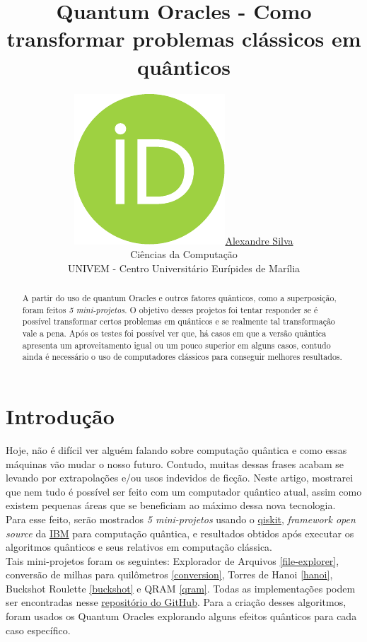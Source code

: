 \documentclass{article}
\title{Quantum Oracles - Como transformar problemas clássicos em quânticos}
\date{}
\author{ \href{https://orcid.org/0009-0008-9134-5974}{\includegraphics[scale=0.06]{orcid.pdf}\hspace{1mm}Alexandre Silva}\\
	Ciências da Computação\\
	UNIVEM - Centro Universitário Eurípides de Marília\\
}
\begin{document}
\maketitle
\begin{abstract}
	A partir do uso de quantum Oracles e outros fatores quânticos, como a superposição, foram feitos \emph{5 mini-projetos}. O objetivo desses projetos foi tentar responder se é possível transformar certos problemas em quânticos e se realmente tal transformação vale a pena. Após os testes foi possível ver que, há casos em que a versão quântica apresenta um aproveitamento igual ou um pouco superior em alguns casos, contudo ainda é necessário o uso de computadores clássicos para conseguir melhores resultados.
\end{abstract}


\section{Introdução}
Hoje, não é difícil ver alguém falando sobre computação quântica e como essas máquinas vão mudar o nosso futuro. Contudo, muitas dessas frases acabam se levando por extrapolações e/ou usos indevidos de ficção. Neste artigo, mostrarei que nem tudo é possível ser feito com um computador quântico atual, assim como existem pequenas áreas que se beneficiam ao máximo dessa nova tecnologia.\\
Para esse feito, serão mostrados \emph{5 mini-projetos} usando o \href{https://www.ibm.com/quantum/qiskit}{qiskit}, \emph{framework open source} da \href{https://www.ibm.com/}{IBM} para computação quântica, e resultados obtidos após executar os algoritmos quânticos e seus relativos em computação clássica.\\
Tais mini-projetos foram os seguintes: Explorador de Arquivos \ref{file-explorer}, conversão de milhas para quilômetros \ref{conversion}, Torres de Hanoi \ref{hanoi}, Buckshot Roulette \ref{buckshot} e QRAM \ref{qram}. Todas as implementações podem ser encontradas nesse  \href{https://github.com/Dpbm/scientific-initiation-1-quantum-oracles}{repositório do GitHub}.
Para a criação desses algoritmos, foram usados os Quantum Oracles explorando alguns efeitos quânticos para cada caso específico. 
\end{document}
